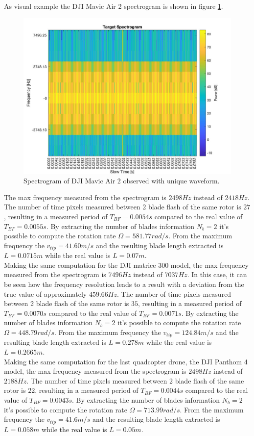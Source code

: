 As visual example the DJI Mavic Air 2 spectrogram is shown in figure \ref{djimavic2-unique-wave-ft}.


\begin{figure}[h!]
\centering
\includegraphics[width=12cm]{FMCW mD analysis-chap4/img/dji_mavic_2_quad_ft_unique.jpg}
\caption{Spectrogram of DJI Mavic Air 2 observed with unique waveform.}
\label{djimavic2-unique-wave-ft}
\end{figure}

The max frequency measured from the spectrogram is $2498 Hz$ instead of $2418 Hz$. The number of time pixels measured between 2 blade flash of the same rotor is $27$, resulting in a measured period of $T_{BF} = 0.0054s$ compared to the real value of $T_{BF} = 0.0055s$. By extracting the number of blades information $N_{b} = 2$ it's possible to compute the rotation rate $\Omega = 581.77 rad/s$. From the maximum frequency the $v_{tip}=41.60 m/s$ and the resulting blade length extracted is $L=0.0715m$ while the real value is $L = 0.07m$.\\
Making the same computation for the DJI matrice 300 model, the max frequency measured from the spectrogram is $7496 Hz$ instead of $7037 Hz$. In this case, it can be seen how the frequency resolution leads to a result with a deviation from the true value of approximately $459.66Hz$. The number of time pixels measured between 2 blade flash of the same rotor is $35$, resulting in a measured period of $T_{BF} = 0.0070s$ compared to the real value of $T_{BF} = 0.0071s$. By extracting the number of blades information $N_{b} = 2$ it's possible to compute the rotation rate $\Omega = 448.79 rad/s$. From the maximum frequency the $v_{tip}=124.84 m/s$ and the resulting blade length extracted is $L=0.278m$ while the real value is $L = 0.2665m$.\\
Making the same computation for the last quadcopter drone, the DJI Panthom 4 model, the max frequency measured from the spectrogram is $2498 Hz$ instead of $2188 Hz$. The number of time pixels measured between 2 blade flash of the same rotor is $22$, resulting in a measured period of $T_{BF} = 0.0044s$ compared to the real value of $T_{BF} = 0.0043s$. By extracting the number of blades information $N_{b} = 2$ it's possible to compute the rotation rate $\Omega = 713.99 rad/s$. From the maximum frequency the $v_{tip}=41.6 m/s$ and the resulting blade length extracted is $L=0.058m$ while the real value is $L = 0.05m$.

